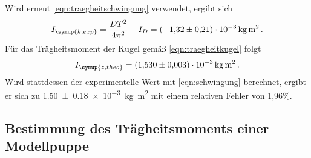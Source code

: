 Wird erneut \eqref{eqn:traegheitschwingung} verwendet, ergibt sich
\begin{equation}
  I_{\symup{k,exp}} = \frac{DT^2}{4\pi^2}-I_D = \SI{-1.32(021)e-3}{\kilogram\meter\squared}\,.
\end{equation}
Für das Trägheitsmoment der Kugel gemäß \eqref{eqn:traegheitkugel} folgt
\begin{equation}
  I_{\symup{z,theo}} = \SI{1.530(0003)e-3}{\kilogram\meter\squared}\,.
\end{equation}
Wird stattdessen der experimentelle Wert mit \eqref{eqn:schwingung} berechnet,
ergibt er sich zu \SI{1.50(018)e-3}{\kilogram\meter\squared} mit einem relativen
Fehler von 1,96\%.

\subsection{Bestimmung des Trägheitsmoments einer Modellpuppe}
